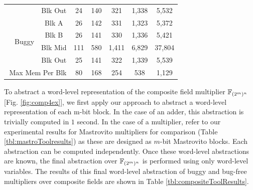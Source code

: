 \begin{table}[hbt]
\begin{center}
{\begin{tabular}{|l|r|c|c|c|c|c|c|}
                      &                         & Blk Out &    24 &      140 &     321 &   1,338 &   5,532 \\
\hhline{~-------}
                      &\multirow{4}{*}{Buggy}   & Blk A   &    26 &      142 &     331 &   1,323 &   5,372 \\
                      &                         & Blk B   &    26 &      141 &     330 &   1,336 &   5,421 \\
                      &                         & Blk Mid &   111 &      580 &   1,411 &   6,829 &  37,804 \\
                      &                         & Blk Out &    25 &      141 &     322 &   1,339 &   5,539 \\
\hline%
\multicolumn{3}{|r|}{Max Mem Per Blk}                      &    80 &      168 &    254 &     538 &   1,129 \\
\hline

\end{tabular}
}
\end{center}
\vspace{-0.2in}
\end{table}

To abstract a word-level representation of the 
composite field multiplier ${\mathbb{F}}_{(2^m)^n}$ [Fig. \ref{fig:comp4ex}], we
first apply our approach to abstract a word-level representation of each m-bit block. 
In the case of an adder, this abstraction is trivially computed in $1$ second. 
In the case of a multiplier, 
refer to our experimental results for Mastrovito multipliers for comparison (Table \ref{tbl:mastroToolresults})
as these are designed as $m$-bit Mastrovito blocks. Each abstraction can be computed independently. 
Once these word-level abstractions are known, the final abstraction over ${\mathbb{F}}_{(2^m)^n}$ is performed
using only word-level variables. 
The results of this final word-level abstraction of 
buggy and bug-free multipliers over composite fields are shown in 
Table \ref{tbl:compositeToolResults}.

